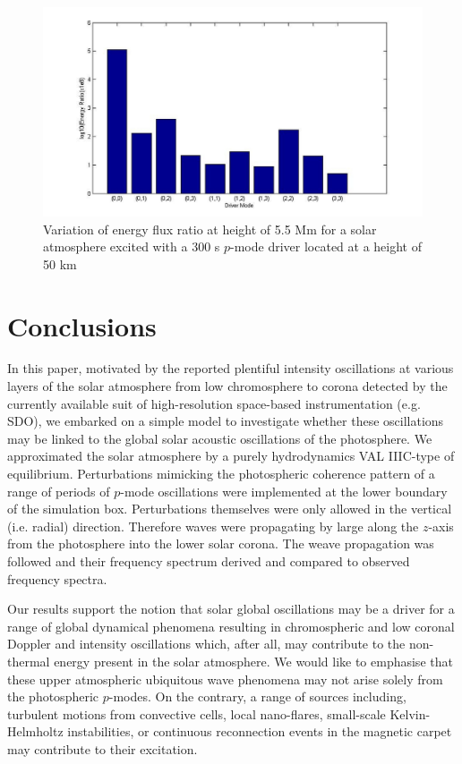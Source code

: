 \documentclass[preprint,authoryear,12pt]{elsarticle}
\begin{document}
\begin{figure}[t]
\includegraphics[scale=0.4]{imrescale/ratio_varoverdrve_eflux_vperiod_forallmodes_300s_5p5Mm.jpg}
\caption{Variation of energy flux ratio at height of 5.5 Mm for a solar atmosphere excited with a 300 s $p$-mode driver 
located at a height of 50 km}
\label{Fig19}
\end{figure}




\section{Conclusions}

In this paper, motivated by the reported plentiful intensity oscillations at various layers of the solar atmosphere from low chromosphere to corona detected by the currently available suit of high-resolution space-based instrumentation (e.g. SDO), we embarked on a simple model to investigate whether these oscillations may be linked to the global solar acoustic oscillations of the photosphere. We approximated the solar atmosphere by a purely hydrodynamics VAL IIIC-type of equilibrium. Perturbations mimicking the photospheric coherence pattern of a range of periods of $p$-mode oscillations were implemented at the lower boundary of the simulation box. Perturbations themselves were only allowed in the vertical (i.e. radial) direction. Therefore waves were propagating by large along the $z$-axis from the photosphere into the lower solar corona. The weave propagation was followed and their frequency spectrum derived and compared to observed frequency spectra.

Our results support the notion that solar global oscillations may be a driver for a range of global dynamical phenomena 
resulting in chromospheric and low coronal Doppler and intensity oscillations which, after all, may contribute to the non-thermal energy present in the solar atmosphere. We would like to emphasise that these upper atmospheric ubiquitous wave phenomena may not arise solely from the photospheric $p$-modes. On the contrary, a range of sources including, turbulent motions from convective cells, local nano-flares, small-scale Kelvin-Helmholtz instabilities, or continuous reconnection events in the magnetic carpet may contribute to their excitation. 
\end{document}
